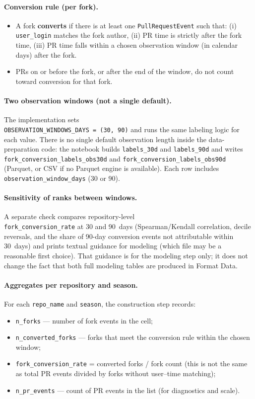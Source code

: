\paragraph{Conversion rule (per fork).}
\begin{itemize}
  \item A fork \textbf{converts} if there is at least one \texttt{PullRequestEvent} such that: (i) \texttt{user\_login} matches the fork author, (ii) PR time is strictly after the fork time, (iii) PR time falls within a chosen observation window (in calendar days) after the fork.
  \item PRs on or before the fork, or after the end of the window, do not count toward conversion for that fork.
\end{itemize}

\paragraph{Two observation windows (not a single default).}
The implementation sets\\ \texttt{OBSERVATION\_WINDOWS\_DAYS = (30, 90)} and runs the same labeling logic for each value. There is no single default observation length inside the data-preparation code: the notebook builds \texttt{labels\_30d} and \texttt{labels\_90d} and writes
\texttt{fork\_conversion\_labels\_obs30d} and
\texttt{fork\_conversion\_labels\_obs90d} (Parquet, or CSV if no Parquet engine is available). Each row includes \texttt{observation\_window\_days} (30 or 90).

\paragraph{Sensitivity of ranks between windows.}
A separate check compares repository-level\\ \texttt{fork\_conversion\_rate} at 30 and 90~days (Spearman/Kendall correlation, decile reversals, and the share of 90-day conversion events not attributable within 30~days) and prints textual guidance for modeling (which file may be a reasonable first choice). That guidance is for the modeling step only; it does not change the fact that both full modeling tables are produced in Format Data.

\paragraph{Aggregates per repository and season.}
For each \texttt{repo\_name} and \texttt{season}, the construction step records:
\begin{itemize}
  \item \texttt{n\_forks} --- number of fork events in the cell;
  \item \texttt{n\_converted\_forks} --- forks that meet the conversion rule within the chosen window;
  \item \texttt{fork\_conversion\_rate} = converted forks / fork count (this is not the same as total PR events divided by forks without user--time matching);
  \item \texttt{n\_pr\_events} --- count of PR events in the list (for diagnostics and scale).
\end{itemize}

